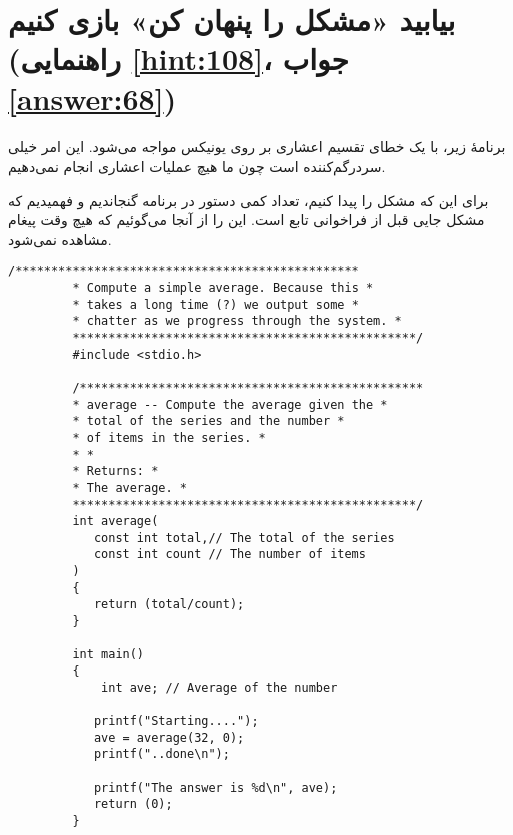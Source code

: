 \section[بیابید «مشکل را پنهان کن» بازی کنیم]{بیابید «مشکل را پنهان کن» بازی کنیم \protect{} (راهنمایی \ref{hint:108}، جواب \ref{answer:68})}
\paragraph{}\label{prog:67}
برنامهٔ زیر، با یک خطای تقسیم اعشاری بر روی یونیکس مواجه می‌شود. این امر خیلی سردرگم‌کننده است چون ما هیچ عملیات اعشاری انجام نمی‌دهیم.

برای این که مشکل را پیدا کنیم، تعداد کمی دستور  در برنامه گنجاندیم و فهمیدیم که مشکل جایی قبل از فراخوانی تابع است. این را از آنجا می‌گوئیم که هیچ وقت پیغام  مشاهده نمی‌شود.

\begin{LTR}
    \begin{lstlisting}[style=C++Style]
         /************************************************
         * Compute a simple average. Because this *
         * takes a long time (?) we output some *
         * chatter as we progress through the system. *
         ************************************************/
         #include <stdio.h>

         /************************************************
         * average -- Compute the average given the *
         * total of the series and the number *
         * of items in the series. *
         * *
         * Returns: *
         * The average. *
         ************************************************/
         int average(
         	const int total,// The total of the series
         	const int count // The number of items
         )
         {
         	return (total/count);
         }

         int main()
         {
        	 int ave; // Average of the number

         	printf("Starting....");
         	ave = average(32, 0);
         	printf("..done\n");

         	printf("The answer is %d\n", ave);
         	return (0);
         }
    \end{lstlisting}
\end{LTR}
